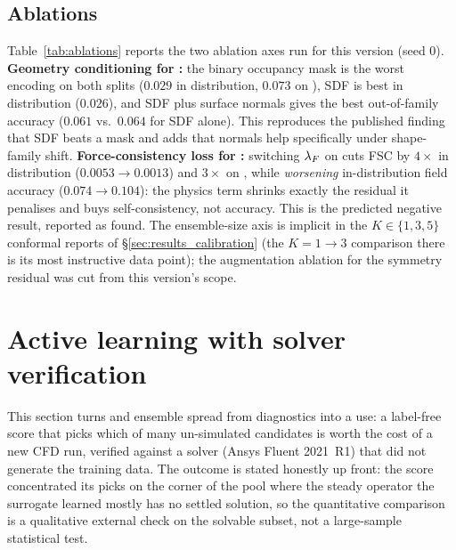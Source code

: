 \subsection{Ablations}
\label{sec:results_ablations}

Table~\ref{tab:ablations} reports the two ablation axes run for this version
(seed 0). \textbf{Geometry conditioning for \Mfno:} the binary occupancy mask
is the worst encoding on both splits ($0.029$ in distribution, $0.073$ on
), SDF is best in distribution ($0.026$), and SDF plus
surface normals gives the best out-of-family accuracy ($0.061$ vs.\ $0.064$
for SDF alone). This reproduces the published finding that SDF beats a mask
\citep{rabeh2025benchmarking} and adds that normals help specifically under
shape-family shift. \textbf{Force-consistency loss for \Mgnn:} switching
$\lambda_F$ on cuts FSC by $4\times$ in distribution ($0.0053\to0.0013$) and
$3\times$ on , while \emph{worsening} in-distribution
field accuracy ($0.074\to0.104$): the physics term shrinks exactly the
residual it penalises and buys self-consistency, not accuracy. This is the
predicted negative result, reported as found. The ensemble-size axis is
implicit in the $K\in\{1,3,5\}$ conformal reports of
\S\ref{sec:results_calibration} (the \Mgnn{} $K=1\to3$ comparison there is
its most instructive data point); the augmentation ablation for the symmetry
residual was cut from this version's scope.

\begin{widetable}
  
\end{widetable}

\section{Active learning with solver verification}
\label{sec:activelearning}

This section turns \FSC{} and ensemble spread from diagnostics into a use: a
label-free score that picks which of many un-simulated candidates is worth the
cost of a new CFD run, verified against a solver (Ansys Fluent 2021~R1) that
did not generate the training data. The outcome is stated honestly up front:
the score concentrated its picks on the corner of the pool where the steady
operator the surrogate learned mostly has no settled solution, so the
quantitative comparison is a qualitative external check on the solvable
subset, not a large-sample statistical test.

